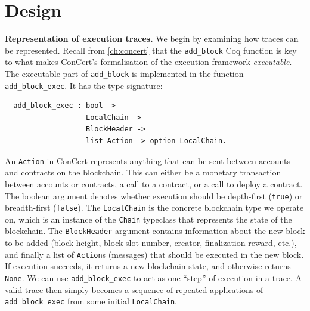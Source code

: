 \documentclass[twoside,11pt,openright]{report}
\newenvironment{code}{\captionsetup{type=figure, singlelinecheck=off, justification=raggedleft}}{}
\newcommand{\coq}[1]{\texttt{#1}}
\begin{document}
\section{Design}
\textbf{Representation of execution traces.} We begin by examining how traces can be represented. Recall from \autoref{ch:concert} that the \coq{add\_block} Coq function is key to what makes ConCert's formalisation of the execution framework \textit{executable}. The executable part of \coq{add\_block} is implemented in the function \coq{add\_block\_exec}. It has the type signature:
\begin{code}
\label{def:add-block-exec}
\begin{verbatim}
  add_block_exec : bool -> 
                   LocalChain -> 
                   BlockHeader -> 
                   list Action -> option LocalChain.
\end{verbatim}
\end{code}
An \coq{Action} in ConCert represents anything that can be sent between accounts and contracts on the blockchain. This can either be a monetary transaction between accounts or contracts, a call to a contract, or a call to deploy a contract. The boolean argument denotes whether execution should be depth-first (\coq{true}) or breadth-first (\coq{false}). The \coq{LocalChain} is the concrete blockchain type we operate on, which is an instance of the \coq{Chain} typeclass that represents the state of the blockchain. The \coq{BlockHeader} argument contains information about the new block to be added (block height, block slot number, creator, finalization reward, etc.), and finally a list of \coq{Action}s (messages) that should be executed in the new block. If execution succeeds, it returns a new blockchain state, and otherwise returns \coq{None}. We can use \coq{add\_block\_exec} to act as one ``step'' of execution in a trace. A valid trace then simply becomes a sequence of repeated applications of \coq{add\_block\_exec} from some initial \coq{LocalChain}.
\medskip\\
\end{document}
